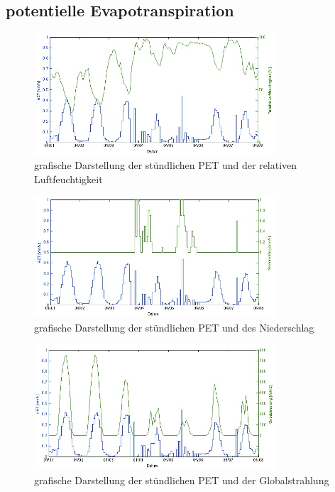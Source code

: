 \begin{appendix}
\section{potentielle Evapotranspiration}
\label{sec:Zeitintervalllpet}

\begin{figure}[H]
\centering
\includegraphics[width=0.8\textwidth]{figures/lys1_aet_feuchte_h.jpg}
\caption{grafische Darstellung der stündlichen PET und der relativen Luftfeuchtigkeit}
\label{fig:aet_feuchte}
\end{figure}

\begin{figure}[H]
\centering
\includegraphics[width=0.8\textwidth]{figures/lys1_aet_niederschlag_h.jpg}
\caption{grafische Darstellung der stündlichen PET und des Niederschlag}
\label{fig:aet_niederschlag}
\end{figure}

\begin{figure}[H]
\centering
\includegraphics[width=0.8\textwidth]{figures/lys1_aet_strahlung_h.jpg}
\caption{grafische Darstellung der stündlichen PET und der Globalstrahlung}
\label{fig:aet_strahlung}
\end{figure}


\end{appendix}
